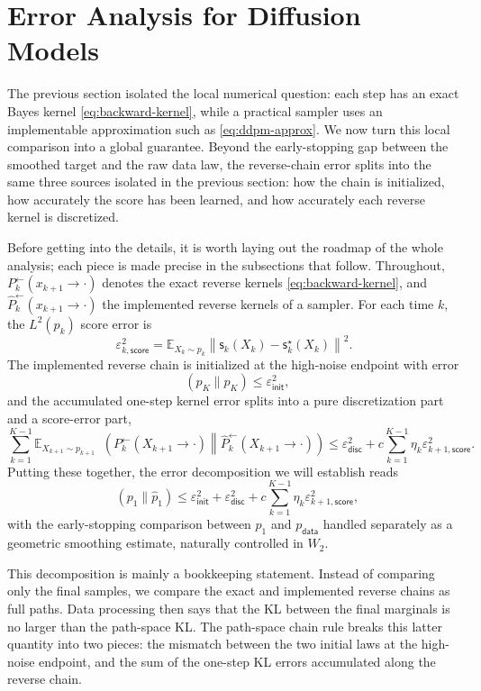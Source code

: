 \documentclass{amsart}
\numberwithin{equation}{section}
\theoremstyle{plain}
\theoremstyle{definition}
\theoremstyle{remark}
\DeclareMathOperator{\KL}{D_{\mathsf{KL}}}
\newcommand{\E}{\mathbb{E}}
\newcommand{\wh}[1]{\widehat{#1}}
\newcommand{\eps}{\varepsilon}
\newcommand{\norm}[1]{\left\lVert #1 \right\rVert}
\newcommand{\pdata}{p_{\mathsf{data}}}
\newcommand{\sstar}{\mathsf{s}^{\star}}
\newcommand{\score}{\mathsf{s}}
\newcommand{\epsinit}{\varepsilon_{\mathsf{init}}}
\newcommand{\epsdisc}{\varepsilon_{\mathsf{disc}}}
\newcommand{\epsscorek}{\varepsilon_{k,\mathsf{score}}}
\begin{document}
\section{Error Analysis for Diffusion Models}
\label{sec:error-analysis}

The previous section isolated the local numerical question: each step has an
exact Bayes kernel \eqref{eq:backward-kernel}, while a practical sampler uses an
implementable approximation such as \eqref{eq:ddpm-approx}.  We now turn this
local comparison into a global guarantee.  Beyond the early-stopping gap between
the smoothed target and the raw data law, the reverse-chain error splits into
the same three sources isolated in the previous section: how the chain is
initialized, how accurately the score has been learned, and how accurately each
reverse kernel is discretized.

Before getting into the details, it is worth laying out the roadmap of the whole analysis; each piece is made precise in the subsections that
follow.  Throughout, $P_k^{\leftarrow}(x_{k+1} \to \cdot)$ denotes the exact
reverse kernels \eqref{eq:backward-kernel}, and
$\wh P_k^{\leftarrow}(x_{k+1} \to \cdot)$ the implemented reverse kernels of a
sampler.  For each time $k$, the $L^2(p_k)$ score error is
\begin{equation}\label{eq:score-error}
    \epsscorek^2
    =
    \E_{X_k\sim p_k}
    \norm{\score_k(X_k)-\sstar_k(X_k)}^2.
\end{equation}
The implemented reverse chain is initialized at the high-noise endpoint with
error
\[
    \KL(p_K\|\wh p_K)\leq \epsinit^2,
\]
and the accumulated one-step kernel error splits into a pure discretization part
and a score-error part,
\[
    \sum_{k=1}^{K-1}
    \E_{X_{k+1}\sim p_{k+1}}
    \KL\!\left(
        P_k^{\leftarrow}(X_{k+1} \to \cdot)
        \middle\|
        \wh P_k^{\leftarrow}(X_{k+1} \to \cdot)
    \right)
    \leq
    \epsdisc^2
    +
    c\sum_{k=1}^{K-1}\eta_k\eps_{k+1,\mathsf{score}}^2.
\]
Putting these together, the error decomposition we will establish reads
\begin{equation}\label{eq:ddpm-error-decomposition}
    \KL(p_1\|\wh p_1)
    \leq
    \epsinit^2
    +
    \epsdisc^2
    +
    c\sum_{k=1}^{K-1}\eta_k\eps_{k+1,\mathsf{score}}^2,
\end{equation}
with the early-stopping comparison between $p_1$ and $\pdata$ handled separately
as a geometric smoothing estimate, naturally controlled in $W_2$.

This decomposition is mainly a bookkeeping statement.  Instead of comparing only the
final samples, we compare the exact and implemented reverse chains as full
paths.  Data processing then says that the KL between the final marginals is no
larger than the path-space KL\@.  The path-space chain rule breaks this latter
quantity into two pieces: the mismatch between the two initial laws at the
high-noise endpoint, and the sum of the one-step KL errors accumulated along the
reverse chain.
\end{document}
